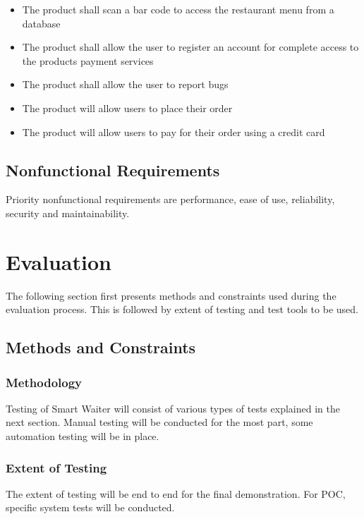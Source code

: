 \documentclass[12pt]{article}
\begin{document}
\noindent
\begin{itemize}
\item The product shall scan a bar code to access the restaurant menu from a database
\item The product shall allow the user to register an account for complete access to the products payment services
\item The product shall allow the user to report bugs
\item The product will allow users to place their order
\item The product will allow users to pay for their order using a credit card
\end{itemize}  

\subsection{Nonfunctional Requirements}
Priority nonfunctional requirements are performance, ease of use, reliability, security and maintainability.


%
%

\section{Evaluation}

The following section first presents methods and constraints used during the evaluation process. This is followed by extent of testing and test tools to be used.

\subsection{ Methods and Constraints} 

\subsubsection{Methodology} 
Testing of Smart Waiter will consist of various types of tests explained in the next section. Manual testing will be conducted for the most part, some automation testing will be in place.

\subsubsection{Extent of Testing}
The extent of testing will be end to end for the final demonstration. For POC, specific system tests will be conducted.
\end{document}
